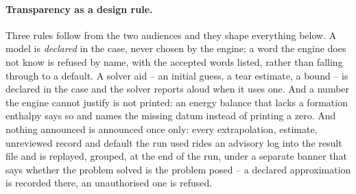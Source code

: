 \documentclass[11pt,a4paper]{article}
\begin{document}
\paragraph{Transparency as a design rule.}  Three rules follow from the two
audiences and they shape everything below.  A model is \emph{declared} in
the case, never chosen by the engine; a word the engine does not know is
refused by name, with the accepted words listed, rather than falling
through to a default.  A solver aid -- an initial guess, a tear estimate, a
bound -- is declared in the case and the solver reports aloud when it uses
one.  And a number the engine cannot justify is not printed: an energy
balance that lacks a formation enthalpy says so and names the missing datum
instead of printing a zero.  And nothing announced is announced once only:
every extrapolation, estimate, unreviewed record and default the run used
rides an advisory log into the result file and is replayed, grouped, at the
end of the run, under a separate banner that says whether the problem
solved is the problem posed -- a declared approximation is recorded there,
an unauthorised one is refused.
\end{document}
